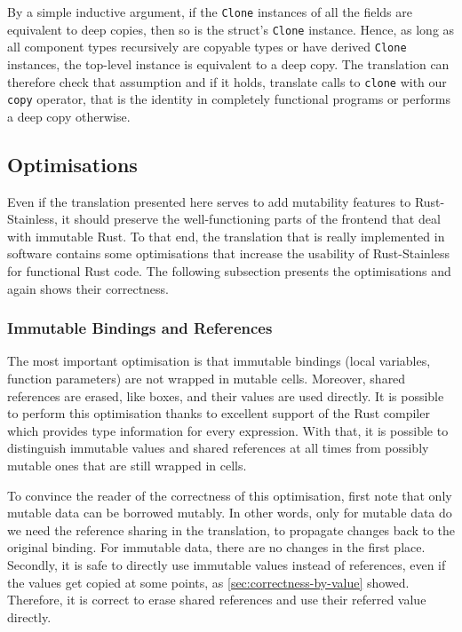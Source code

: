 By a simple inductive argument, if the \lstinline!Clone! instances of all the
fields are equivalent to deep copies, then so is the struct's \lstinline!Clone!
instance. Hence, as long as all component types recursively are copyable types
or have derived \lstinline!Clone! instances, the top-level instance is
equivalent to a deep copy. The translation can therefore check that assumption
and if it holds, translate calls to \lstinline!clone! with our \lstinline!copy!
operator, that is the identity in completely functional programs or performs a
deep copy otherwise.



\subsection{Optimisations}
\label{optimisations}

Even if the translation presented here serves to add mutability features to
Rust-Stainless, it should preserve the well-functioning parts of the frontend
that deal with immutable Rust. To that end, the translation that is really
implemented in software contains some optimisations that increase the usability
of Rust-Stainless for functional Rust code. The following subsection presents
the optimisations and again shows their correctness.


\subsubsection{Immutable Bindings and References}

The most important optimisation is that immutable bindings (local variables,
function parameters) are not wrapped in mutable cells. Moreover, shared
references are erased, like boxes, and their values  are used directly. It is
possible to perform this optimisation thanks to excellent support of the Rust
compiler which provides type information for every expression. With that, it is
possible to distinguish immutable values and shared references at all times from
possibly mutable ones that are still wrapped in cells.

To convince the reader of the correctness of this optimisation, first note that
only mutable data can be borrowed mutably. In other words, only for mutable data
do we need the reference sharing in the translation, to propagate changes back
to the original binding. For immutable data, there are no changes in the first
place. Secondly, it is safe to directly use immutable values instead of
references, even if the values get copied at some points, as
\autoref{sec:correctness-by-value} showed. Therefore, it is correct to erase
shared references and use their referred value directly.

